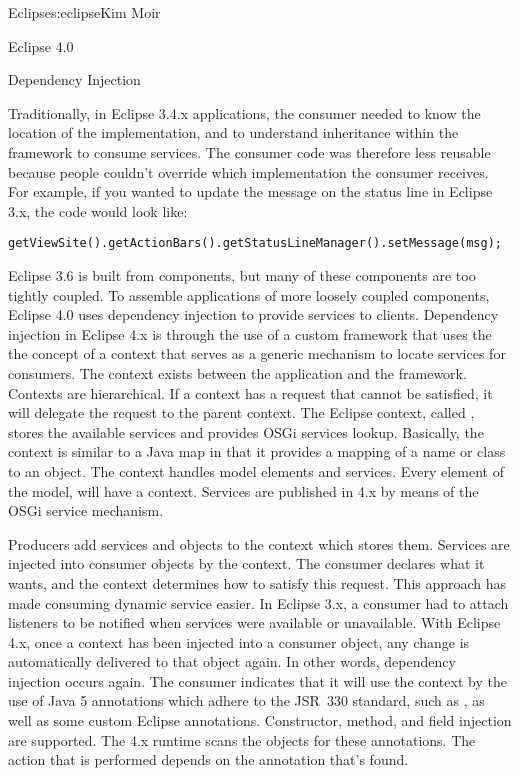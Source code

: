 \begin{aosachapter}{Eclipse}{s:eclipse}{Kim Moir}
\begin{aosasect1}{Eclipse 4.0}
\begin{aosasect2}{Dependency Injection}

\pagebreak

Traditionally, in Eclipse 3.4.x applications, the consumer needed
to know the location of the implementation, and to
understand inheritance within the framework to
consume services. The consumer code was therefore less reusable
because people couldn't override which implementation the consumer
receives. For example, if you wanted to update the message on the
status line in Eclipse 3.x, the code would look like:

\begin{verbatim}
getViewSite().getActionBars().getStatusLineManager().setMessage(msg);
\end{verbatim}

Eclipse 3.6 is built from components, but many of these components are
too tightly coupled. To assemble applications of more loosely coupled
components, Eclipse 4.0 uses dependency injection to provide services
to clients. Dependency injection in Eclipse 4.x is through the use of
a custom framework that uses the the concept of a context that serves
as a generic mechanism to locate services for consumers.  The context
exists between the application and the framework. Contexts are
hierarchical. If a context has a request that cannot be satisfied,
it will delegate the request to the parent context. The Eclipse
context, called , stores the available services and
provides OSGi services lookup.  Basically, the context is similar to a
Java map in that it provides a mapping of a name or class to an
object.  The context handles model elements and services.  Every
element of the model, will have a context. Services are published in
4.x by means of the OSGi service mechanism.


Producers add services and objects to the context which stores them.
Services are injected into consumer objects by the context. The
consumer declares what it wants, and the context determines how to
satisfy this request. This approach has made consuming dynamic service
easier. In Eclipse 3.x, a consumer had to attach listeners to be
notified when services were available or unavailable. With Eclipse
4.x, once a context has been injected into a consumer object, any
change is automatically delivered to that object again. In other
words, dependency injection occurs again. The consumer indicates that
it will use the context by the use of Java 5 annotations which adhere
to the JSR~330 standard, such as , as well as some
custom Eclipse annotations. Constructor, method, and field injection
are supported.  The 4.x runtime scans the objects for these
annotations. The action that is performed depends on the annotation
that's found.


\end{aosasect2}
\end{aosasect1}
\end{aosachapter}
